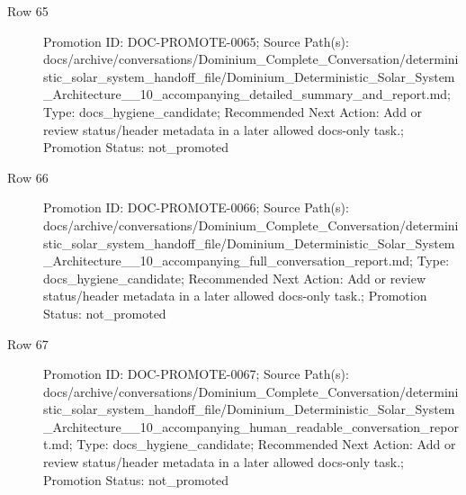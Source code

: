 \documentclass[9pt,a4paper,openany]{book}
\begin{document}
\begin{description}
\item[Row 65] Promotion ID: DOC-\allowbreak{}PROMOTE-\allowbreak{}0065; Source Path(s): docs/\allowbreak{}archive/\allowbreak{}conversations/\allowbreak{}Dominium\_\allowbreak{}Complete\_\allowbreak{}Conversation/\allowbreak{}deterministic\_\allowbreak{}solar\_\allowbreak{}system\_\allowbreak{}handoff\_\allowbreak{}file/\allowbreak{}Dominium\_\allowbreak{}Deterministic\_\allowbreak{}Solar\_\allowbreak{}System\_\allowbreak{}Architecture\_\allowbreak{}\_\allowbreak{}10\_\allowbreak{}accompanying\_\allowbreak{}detailed\_\allowbreak{}summary\_\allowbreak{}and\_\allowbreak{}report.\allowbreak{}md; Type: docs\_\allowbreak{}hygiene\_\allowbreak{}candidate; Recommended Next Action: Add or review status/\allowbreak{}header metadata in a later allowed docs-\allowbreak{}only task.\allowbreak{}; Promotion Status: not\_\allowbreak{}promoted
\item[Row 66] Promotion ID: DOC-\allowbreak{}PROMOTE-\allowbreak{}0066; Source Path(s): docs/\allowbreak{}archive/\allowbreak{}conversations/\allowbreak{}Dominium\_\allowbreak{}Complete\_\allowbreak{}Conversation/\allowbreak{}deterministic\_\allowbreak{}solar\_\allowbreak{}system\_\allowbreak{}handoff\_\allowbreak{}file/\allowbreak{}Dominium\_\allowbreak{}Deterministic\_\allowbreak{}Solar\_\allowbreak{}System\_\allowbreak{}Architecture\_\allowbreak{}\_\allowbreak{}10\_\allowbreak{}accompanying\_\allowbreak{}full\_\allowbreak{}conversation\_\allowbreak{}report.\allowbreak{}md; Type: docs\_\allowbreak{}hygiene\_\allowbreak{}candidate; Recommended Next Action: Add or review status/\allowbreak{}header metadata in a later allowed docs-\allowbreak{}only task.\allowbreak{}; Promotion Status: not\_\allowbreak{}promoted
\item[Row 67] Promotion ID: DOC-\allowbreak{}PROMOTE-\allowbreak{}0067; Source Path(s): docs/\allowbreak{}archive/\allowbreak{}conversations/\allowbreak{}Dominium\_\allowbreak{}Complete\_\allowbreak{}Conversation/\allowbreak{}deterministic\_\allowbreak{}solar\_\allowbreak{}system\_\allowbreak{}handoff\_\allowbreak{}file/\allowbreak{}Dominium\_\allowbreak{}Deterministic\_\allowbreak{}Solar\_\allowbreak{}System\_\allowbreak{}Architecture\_\allowbreak{}\_\allowbreak{}10\_\allowbreak{}accompanying\_\allowbreak{}human\_\allowbreak{}readable\_\allowbreak{}conversation\_\allowbreak{}report.\allowbreak{}md; Type: docs\_\allowbreak{}hygiene\_\allowbreak{}candidate; Recommended Next Action: Add or review status/\allowbreak{}header metadata in a later allowed docs-\allowbreak{}only task.\allowbreak{}; Promotion Status: not\_\allowbreak{}promoted

\end{description}
\end{document}
